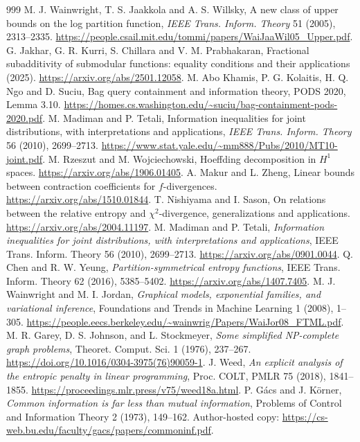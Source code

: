 \documentclass[11pt,a4paper]{article}
\theoremstyle{definition}\newtheorem{definition}[theorem]{Definition}
\theoremstyle{remark}\newtheorem{remark}[theorem]{Remark}
\numberwithin{equation}{section}
\begin{document}
\begin{thebibliography}{999}
 M. J. Wainwright, T. S. Jaakkola and A. S. Willsky, A new class of upper bounds on the log partition function, \emph{IEEE Trans. Inform. Theory} 51 (2005), 2313--2335. \url{https://people.csail.mit.edu/tommi/papers/WaiJaaWil05_Upper.pdf}.
 G. Jakhar, G. R. Kurri, S. Chillara and V. M. Prabhakaran, Fractional subadditivity of submodular functions: equality conditions and their applications (2025). \url{https://arxiv.org/abs/2501.12058}.
 M. Abo Khamis, P. G. Kolaitis, H. Q. Ngo and D. Suciu, Bag query containment and information theory, PODS 2020, Lemma 3.10. \url{https://homes.cs.washington.edu/~suciu/bag-containment-pods-2020.pdf}.
 M. Madiman and P. Tetali, Information inequalities for joint distributions, with interpretations and applications, \emph{IEEE Trans. Inform. Theory} 56 (2010), 2699--2713. \url{https://www.stat.yale.edu/~mm888/Pubs/2010/MT10-joint.pdf}.
 M. Rzeszut and M. Wojciechowski, Hoeffding decomposition in $H^1$ spaces. \url{https://arxiv.org/abs/1906.01405}.
 A. Makur and L. Zheng, Linear bounds between contraction coefficients for $f$-divergences. \url{https://arxiv.org/abs/1510.01844}.
 T. Nishiyama and I. Sason, On relations between the relative entropy and $\chi^2$-divergence, generalizations and applications. \url{https://arxiv.org/abs/2004.11197}.
 M. Madiman and P. Tetali, \emph{Information inequalities for joint distributions, with interpretations and applications}, IEEE Trans. Inform. Theory 56 (2010), 2699--2713. \url{https://arxiv.org/abs/0901.0044}.
 Q. Chen and R. W. Yeung, \emph{Partition-symmetrical entropy functions}, IEEE Trans. Inform. Theory 62 (2016), 5385--5402. \url{https://arxiv.org/abs/1407.7405}.
 M. J. Wainwright and M. I. Jordan, \emph{Graphical models, exponential families, and variational inference}, Foundations and Trends in Machine Learning 1 (2008), 1--305. \url{https://people.eecs.berkeley.edu/~wainwrig/Papers/WaiJor08_FTML.pdf}.
 M. R. Garey, D. S. Johnson, and L. Stockmeyer, \emph{Some simplified NP-complete graph problems}, Theoret. Comput. Sci. 1 (1976), 237--267. \url{https://doi.org/10.1016/0304-3975(76)90059-1}.
 J. Weed, \emph{An explicit analysis of the entropic penalty in linear programming}, Proc. COLT, PMLR 75 (2018), 1841--1855. \url{https://proceedings.mlr.press/v75/weed18a.html}.
 P. G\'acs and J. K\"orner, \emph{Common information is far less than mutual information}, Problems of Control and Information Theory 2 (1973), 149--162. Author-hosted copy: \url{https://cs-web.bu.edu/faculty/gacs/papers/commoninf.pdf}.

\end{thebibliography}
\end{document}
